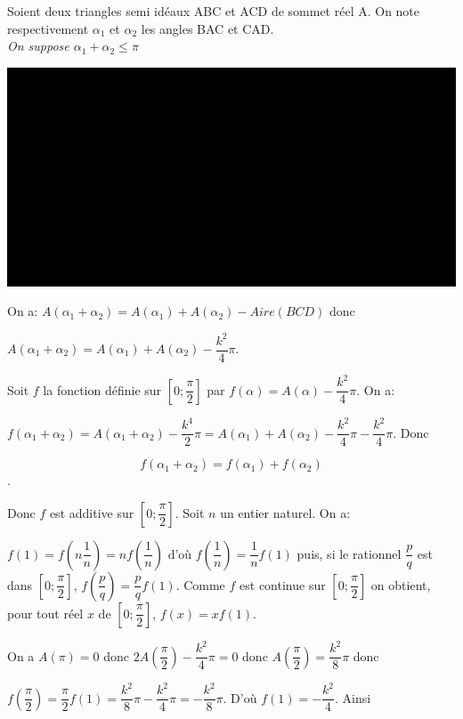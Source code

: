 \documentclass[a4paper, 12pt, twoside]{book}
\begin{document}
   Soient deux triangles semi idéaux ABC et ACD de sommet réel A. On note respectivement  $\alpha_{1}$ et $\alpha_{2}$ les angles BAC et CAD. \\
   
  \textit{ On suppose  $\alpha_{1}+ \alpha_{2}\leq\pi$\\}
  
   
 \includegraphics[scale=0.7]{figures/hyper24.eps}
  
  On a: $A(\alpha_{1}+ \alpha_{2})=A(\alpha_{1})+A(\alpha_{2})-Aire(BCD)$ donc \
  
   $A(\alpha_{1}+ \alpha_{2})=A(\alpha_{1})+A(\alpha_{2})-\dfrac{k^{2}}{4}\pi$. \
   
 Soit $f$ la fonction définie sur $[0; \dfrac{\pi}{2}]$ par $f(\alpha)=A(\alpha)-\dfrac{k^{2}}{4}\pi$. On a:\
 
 $f(\alpha_{1}+ \alpha_{2})=A(\alpha_{1}+ \alpha_{2})-\dfrac{k^{4}}{2}\pi=A(\alpha_{1})+A( \alpha_{2})-\dfrac{k^{2}}{4}\pi-\dfrac{k^{2}}{4}\pi$. Donc\
 
 $$f(\alpha_{1}+ \alpha_{2})=f(\alpha_{1})+f( \alpha_{2})$$.
 
 Donc $f$ est additive sur  $[0; \dfrac{\pi}{2}]$. Soit $n$ un entier naturel. On a:\
 
  $f(1)=f(n\dfrac{1}{n})=nf(\dfrac{1}{n})$ d'où $f(\dfrac{1}{n})=\dfrac{1}{n}f(1)$ puis, si le rationnel $\dfrac{p}{q}$ est dans  $[0; \dfrac{\pi}{2}]$, $f( \dfrac{p}{q})=\dfrac{p}{q}f(1)$. Comme $f$ est continue sur $[0; \dfrac{\pi}{2}]$ on obtient, pour tout réel $x$ de $[0; \dfrac{\pi}{2}]$, $f(x)=xf(1)$.\
  
  On a $A(\pi)=0$ donc $2A(\dfrac{\pi}{2})-\dfrac{k^{2}}{4}\pi=0$ donc  $A(\dfrac{\pi}{2})=\dfrac{k^{2}}{8}\pi$ donc\
  
   $f(\dfrac{\pi}{2})=\dfrac{\pi}{2}f(1)=\dfrac{k^{2}}{8}\pi-\dfrac{k^{2}}{4}\pi=-\dfrac{k^{2}}{8}\pi$. D'où $f(1)=-\dfrac{k^{2}}{4}$. Ainsi\
   
\end{document}
